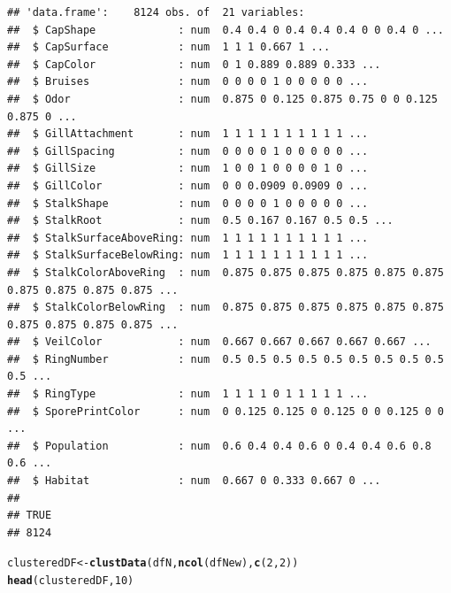 \documentclass[10pt  ,usenames, dvipsnames]{article}\usepackage[]{graphicx}\usepackage[]{color}
\makeatletter
\newcommand{\hlnum}[1]{\textcolor[rgb]{0.686,0.059,0.569}{#1}}%
\newcommand{\hlstd}[1]{\textcolor[rgb]{0.345,0.345,0.345}{#1}}%
\newcommand{\hlkwb}[1]{\textcolor[rgb]{0.69,0.353,0.396}{#1}}%
\newcommand{\hlkwd}[1]{\textcolor[rgb]{0.737,0.353,0.396}{\textbf{#1}}}%
\newenvironment{kframe}{%
 \def\at@end@of@kframe{}%
 \ifinner\ifhmode%
  \def\at@end@of@kframe{\end{minipage}}%
  \begin{minipage}{\columnwidth}%
 \fi\fi%
 \def\FrameCommand##1{\hskip\@totalleftmargin \hskip-\fboxsep
 \colorbox{shadecolor}{##1}\hskip-\fboxsep
     \hskip-\linewidth \hskip-\@totalleftmargin \hskip\columnwidth}%
 \MakeFramed {\advance\hsize-\width
   \@totalleftmargin\z@ \linewidth\hsize
   \@setminipage}}%
 {\par\unskip\endMakeFramed%
 \at@end@of@kframe}
\newenvironment{knitrout}{}{} %
\makeatother
\begin{document}
\begin{knitrout}
\color{fgcolor}\begin{kframe}
\begin{verbatim}
## 'data.frame':	8124 obs. of  21 variables:
##  $ CapShape             : num  0.4 0.4 0 0.4 0.4 0.4 0 0 0.4 0 ...
##  $ CapSurface           : num  1 1 1 0.667 1 ...
##  $ CapColor             : num  0 1 0.889 0.889 0.333 ...
##  $ Bruises              : num  0 0 0 0 1 0 0 0 0 0 ...
##  $ Odor                 : num  0.875 0 0.125 0.875 0.75 0 0 0.125 0.875 0 ...
##  $ GillAttachment       : num  1 1 1 1 1 1 1 1 1 1 ...
##  $ GillSpacing          : num  0 0 0 0 1 0 0 0 0 0 ...
##  $ GillSize             : num  1 0 0 1 0 0 0 0 1 0 ...
##  $ GillColor            : num  0 0 0.0909 0.0909 0 ...
##  $ StalkShape           : num  0 0 0 0 1 0 0 0 0 0 ...
##  $ StalkRoot            : num  0.5 0.167 0.167 0.5 0.5 ...
##  $ StalkSurfaceAboveRing: num  1 1 1 1 1 1 1 1 1 1 ...
##  $ StalkSurfaceBelowRing: num  1 1 1 1 1 1 1 1 1 1 ...
##  $ StalkColorAboveRing  : num  0.875 0.875 0.875 0.875 0.875 0.875 0.875 0.875 0.875 0.875 ...
##  $ StalkColorBelowRing  : num  0.875 0.875 0.875 0.875 0.875 0.875 0.875 0.875 0.875 0.875 ...
##  $ VeilColor            : num  0.667 0.667 0.667 0.667 0.667 ...
##  $ RingNumber           : num  0.5 0.5 0.5 0.5 0.5 0.5 0.5 0.5 0.5 0.5 ...
##  $ RingType             : num  1 1 1 1 0 1 1 1 1 1 ...
##  $ SporePrintColor      : num  0 0.125 0.125 0 0.125 0 0 0.125 0 0 ...
##  $ Population           : num  0.6 0.4 0.4 0.6 0 0.4 0.4 0.6 0.8 0.6 ...
##  $ Habitat              : num  0.667 0 0.333 0.667 0 ...
## 
## TRUE 
## 8124
\end{verbatim}
\end{kframe}
\end{knitrout}

\begin{knitrout}
\color{fgcolor}\begin{kframe}
\begin{alltt}
\hlstd{clusteredDF} \hlkwb{<-} \hlkwd{clustData}\hlstd{(dfN,}\hlkwd{ncol}\hlstd{(dfNew),} \hlkwd{c}\hlstd{(}\hlnum{2}\hlstd{,}\hlnum{2}\hlstd{))}
\hlkwd{head}\hlstd{(clusteredDF,}\hlnum{10}\hlstd{)}
\end{alltt}
\end{kframe}
\end{knitrout}
\end{document}
